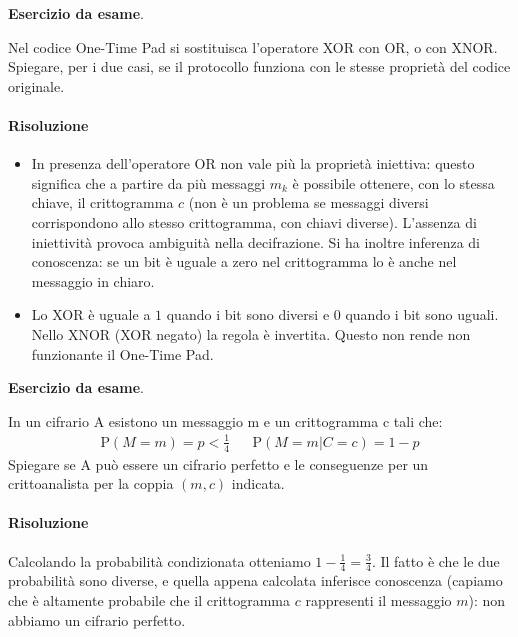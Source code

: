 \begin{framed}
	\noindent \textbf{Esercizio da esame}.
	
	\noindent Nel codice One-Time Pad si sostituisca l’operatore XOR con OR, o con XNOR.
	Spiegare, per i due casi, se il protocollo funziona con le stesse proprietà del codice originale.
	\paragraph{Risoluzione} 
	\begin{itemize}
		\item In presenza dell'operatore OR non vale più la proprietà iniettiva: questo significa che a partire da più messaggi $m_k$ è possibile ottenere, con lo stessa chiave, il crittogramma $c$ (non è un problema se messaggi diversi corrispondono allo stesso crittogramma, con chiavi diverse). L'assenza di iniettività provoca ambiguità nella decifrazione. Si ha inoltre inferenza di conoscenza: se un bit è uguale a zero nel crittogramma lo è anche nel messaggio in chiaro. 
		\item Lo XOR è uguale a $1$ quando i bit sono diversi e $0$ quando i bit sono uguali. Nello XNOR (XOR negato) la regola è invertita. Questo non rende non funzionante il One-Time Pad.
	\end{itemize}
\end{framed}


\begin{framed}
	\noindent \textbf{Esercizio da esame}.
	
	\noindent In un cifrario A esistono un messaggio m e un crittogramma c tali che: \begin{align*}\text{P}(M = m) = p < \frac{1}{4}&&\text{P}(M = m| C = c) = 1- p\end{align*}Spiegare se A può essere un cifrario perfetto e le conseguenze per un
	crittoanalista per la coppia $(m,c)$ indicata.
	
	\paragraph{Risoluzione} Calcolando la probabilità condizionata otteniamo $1-\frac{1}{4}=\frac{3}{4}$. Il fatto è che le due probabilità sono diverse, e quella appena calcolata inferisce conoscenza (capiamo che è altamente probabile che il crittogramma $c$ rappresenti il messaggio $m$): non abbiamo un cifrario perfetto.
\end{framed}


